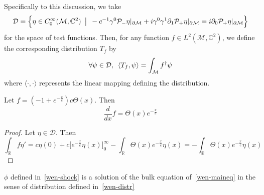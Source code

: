 \begin{definition}\label{wen-distr}
Specifically to this discussion, 
we take
\begin{equation*}
\mathcal{D} = \Big\{\eta \in C^{\infty}_0(\mathcal{M}, \mathbb{C}^2) \enskip\big\vert \enskip -c^{-1}\gamma^0\mathcal{P}_-\eta\vert_{\partial\mathcal{M}} + i\gamma^0\gamma^1\partial_1\mathcal{P}_+\eta\vert_{\partial \mathcal{M}}= i\partial_0\mathcal{P}_+\eta\vert_{\partial\mathcal{M}} \Big\}
\end{equation*}
for the space of test functions. 
Then, for any function $f \in L^{2}(\mathcal{M}, \mathbb{C}^2)$, we define the corresponding distribution $T_f$ by
\begin{equation*}
\forall \psi\in \mathcal{D}, \enskip \langle T_f, \psi\rangle = \int_{\mathcal{M}} f^\dagger \psi
\end{equation*}
where $\langle \cdot , \cdot \rangle$ represents the linear mapping defining the distribution.
\end{definition}
%
\begin{lemma}\label{wen-lem}
Let $f = (-1+ e^{-\frac{x}{c}})c\Theta(x)$. Then \begin{equation*}\frac{d}{d x} f = \Theta(x)e^{-\frac {x}{c}}\end{equation*}
\end{lemma}
\begin{proof}
Let $\eta\in \mathcal{D}$. Then
\begin{equation*}
\int_\mathbb{R} f \eta'  =   c\eta(0) + c\Big[ e^{-\frac{x}{c}} \eta(x) \Big]^\infty_0 - \int_\mathbb{R}\Theta(x)e^{-\frac{x}{c}}\eta(x) = -\int_\mathbb{R}\Theta(x)e^{-\frac{x}{c}}\eta(x)
\end{equation*}
\end{proof}
\begin{proposition}
$\phi$ defined in~\cref{wen-shock} is a solution of the bulk equation of~\cref{wen-maineq} in the sense of distribution defined in~\cref{wen-distr}
\end{proposition}
